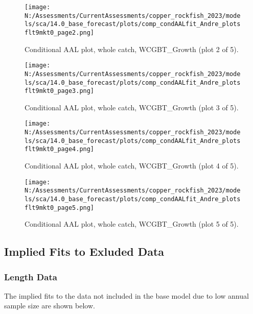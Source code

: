 \documentclass[11pt,
  english,
  letterpaper,
]{article}
\begin{document}
\begin{figure}
\centering
\texttt{[image: N:/Assessments/CurrentAssessments/copper\_rockfish\_2023/models/sca/14.0\_base\_forecast/plots/comp\_condAALfit\_Andre\_plotsflt9mkt0\_page2.png]}
\caption{Conditional AAL plot, whole catch, WCGBT\_Growth (plot 2 of 5).\label{fig:comp_condAALfit_Andre_plotsflt9mkt0_page2}}
\end{figure}

\begin{figure}
\centering
\texttt{[image: N:/Assessments/CurrentAssessments/copper\_rockfish\_2023/models/sca/14.0\_base\_forecast/plots/comp\_condAALfit\_Andre\_plotsflt9mkt0\_page3.png]}
\caption{Conditional AAL plot, whole catch, WCGBT\_Growth (plot 3 of 5).\label{fig:comp_condAALfit_Andre_plotsflt9mkt0_page3}}
\end{figure}

\begin{figure}
\centering
\texttt{[image: N:/Assessments/CurrentAssessments/copper\_rockfish\_2023/models/sca/14.0\_base\_forecast/plots/comp\_condAALfit\_Andre\_plotsflt9mkt0\_page4.png]}
\caption{Conditional AAL plot, whole catch, WCGBT\_Growth (plot 4 of 5).\label{fig:comp_condAALfit_Andre_plotsflt9mkt0_page4}}
\end{figure}

\begin{figure}
\centering
\texttt{[image: N:/Assessments/CurrentAssessments/copper\_rockfish\_2023/models/sca/14.0\_base\_forecast/plots/comp\_condAALfit\_Andre\_plotsflt9mkt0\_page5.png]}
\caption{Conditional AAL plot, whole catch, WCGBT\_Growth (plot 5 of 5).\label{fig:comp_condAALfit_Andre_plotsflt9mkt0_page5}}
\end{figure}

\pagebreak

\hypertarget{excluded-data}{%
\subsection{Implied Fits to Exluded Data}\label{excluded-data}}

\hypertarget{length-data-1}{%
\subsubsection{Length Data}\label{length-data-1}}

The implied fits to the data not included in the base model due to low annual sample size are shown below.
\end{document}
